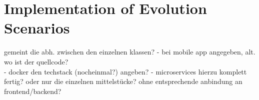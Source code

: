 \chapter{Implementation of Evolution Scenarios}
gemeint die abh. zwischen den einzelnen klassen?
 - bei mobile app angegeben, alt. wo ist der quellcode?\\
 - docker den techstack (nocheinmal?) angeben?
 - microservices hierzu komplett fertig? oder nur die einzelnen mittelstücke? ohne entsprechende anbindung an frontend/backend?
